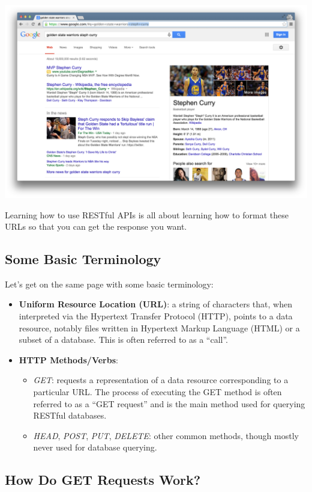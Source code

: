 \documentclass[]{book}
\begin{document}
\begin{center}\includegraphics[width=0.7\linewidth]{img/google_link_change} \end{center}

Learning how to use RESTful APIs is all about learning how to format these URLs so that you can get the response you want.

\hypertarget{some-basic-terminology}{%
\subsection{Some Basic Terminology}\label{some-basic-terminology}}

Let's get on the same page with some basic terminology:

\begin{itemize}
\item
  \textbf{Uniform Resource Location (URL)}: a string of characters that, when interpreted via the Hypertext Transfer Protocol (HTTP), points to a data resource, notably files written in Hypertext Markup Language (HTML) or a subset of a database. This is often referred to as a ``call''.
\item
  \textbf{HTTP Methods/Verbs}:

  \begin{itemize}
  \item
    \emph{GET}: requests a representation of a data resource corresponding to a particular URL. The process of executing the GET method is often referred to as a ``GET request'' and is the main method used for querying RESTful databases.
  \item
    \emph{HEAD}, \emph{POST}, \emph{PUT}, \emph{DELETE}: other common methods, though mostly never used for database querying.
  \end{itemize}
\end{itemize}

\hypertarget{how-do-get-requests-work}{%
\subsection{How Do GET Requests Work?}\label{how-do-get-requests-work}}
\end{document}
